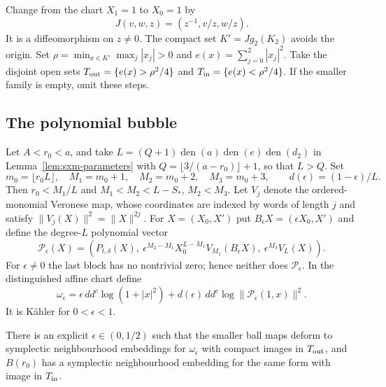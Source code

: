 Change from the chart $X_1=1$ to $X_0=1$ by
\[
 J(v,w,z)=(z^{-1},v/z,w/z).
\]
It is a diffeomorphism on $z\ne0$. The compact set
$K'=Jg_2(K_2)$ avoids the origin. Set
$\rho=\min_{x\in K'}\max_j|x_j|>0$ and
$e(x)=\sum_{j=0}^2|x_j|^2$. Take the disjoint open sets
$T_{\rm out}=\{e(x)>\rho^2/4\}$ and
$T_{\rm in}=\{e(x)<\rho^2/4\}$. If the smaller family is empty, omit these steps.

\subsection{The polynomial bubble}\label{sec:sxr-bubble}

Let $A<r_0<a$, and take $L=(Q+1)\operatorname{den}(a)\operatorname{den}(e)\operatorname{den}(d_2)$ in
Lemma~\ref{lem:sxm-parameters} with $Q=\lfloor3/(a-r_0)\rfloor+1$, so that $L>Q$. Set
\[
 m_0=\lfloor r_0L\rfloor,\quad M_1=m_0+1,\quad M_2=m_0+2,\quad M_3=m_0+3,
 \qquad d(\epsilon)=(1-\epsilon)/L.
\]
Then $r_0<M_1/L$ and $M_1<M_2<L-S_*$, $M_2<M_3$.
Let $V_j$ denote the ordered-monomial Veronese map, whose coordinates are indexed
by words of length $j$ and satisfy $\|V_j(X)\|^2=\|X\|^{2j}$.
For $X=(X_0,X')$ put $B_\epsilon X=(\epsilon X_0,X')$ and define the degree-$L$
polynomial vector
\begin{equation}\label{eq:sxr-bubble-polynomial}
 \mathcal P_\epsilon(X)=
 \left(P_{t,\delta}(X),\
       \epsilon^{M_2-M_1}X_0^{L-M_1}V_{M_1}(B_\epsilon X),\
       \epsilon^{M_3}V_L(X)\right).
\end{equation}
For $\epsilon\ne0$ the last block has no nontrivial zero; hence neither does
$\mathcal P_\epsilon$.
In the distinguished affine chart define
\begin{equation}\label{eq:sxr-degree-form}
 \omega_\epsilon=
 \epsilon\,dd^c\log(1+|x|^2)
       +d(\epsilon)\,dd^c\log\|\mathcal P_\epsilon(1,x)\|^2.
\end{equation}
It is Kähler for $0<\epsilon<1$.

\begin{proposition}\label{prop:sxr-bubble}
There is an explicit $\epsilon\in(0,1/2)$ such that the smaller ball maps deform
to symplectic neighbourhood embeddings for $\omega_\epsilon$ with compact images
in $T_{\rm out}$, and $B(r_0)$ has a symplectic neighbourhood embedding for the
same form with image in $T_{\rm in}$.
\end{proposition}

